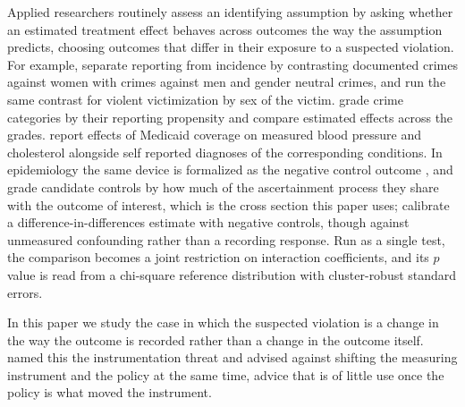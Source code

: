 \documentclass[12pt]{article}
\theoremstyle{definition}
\numberwithin{equation}{section}
\begin{document}
Applied researchers routinely assess an identifying assumption by asking whether
an estimated treatment effect behaves across outcomes the way the assumption
predicts, choosing outcomes that differ in their exposure to a suspected
violation. For example, \citet{iyer2012political} separate reporting from
incidence by contrasting documented crimes against women with crimes against men
and gender neutral crimes, and \citet{miller2019female} run the same contrast for
violent victimization by sex of the victim. \citet{weisburd2024crs} grade crime
categories by their reporting propensity and compare estimated effects across the
grades. \citet{baicker2013oregon} report effects of Medicaid coverage on measured
blood pressure and cholesterol alongside self reported diagnoses of the
corresponding conditions. In epidemiology the same device is formalized as the
negative control outcome \citep{lipsitch2010negative}, and
\citet{nunez2025detection} grade candidate controls by how much of the
ascertainment process they share with the outcome of interest, which is the
cross section this paper uses; \citet{zhang2025nco} calibrate a
difference-in-differences estimate with negative controls, though against
unmeasured confounding rather than a recording response. Run as a single test, the
comparison becomes a joint restriction on interaction coefficients, and its $p$
value is read from a chi-square reference distribution with cluster-robust standard errors.

In this paper we study the case in which the suspected violation is a change in
the way the outcome is recorded rather than a change in the outcome itself.
\citet{campbell1963experimental} named this the instrumentation threat and
advised against shifting the measuring instrument and the policy at the same
time, advice that is of little use once the policy is what moved the instrument.
\end{document}
